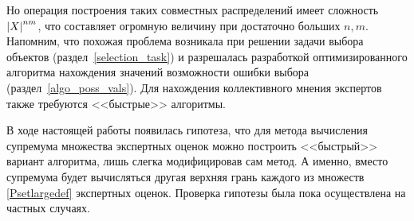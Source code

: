 Но операция построения таких совместных распределений имеет сложность $\left| X \right|^{nm}$, что составляет огромную величину при достаточно больших $n, m$. Напомним, что похожая проблема возникала при решении задачи выбора объектов (раздел~\ref{selection_task}) и разрешалась разработкой оптимизированного алгоритма нахождения значений возможности ошибки выбора (раздел~\ref{algo_poss_vals}). Для нахождения коллективного мнения экспертов также требуются <<быстрые>> алгоритмы.

В ходе настоящей работы появилась гипотеза, что для метода вычисления супремума множества экспертных оценок можно построить <<быстрый>> вариант алгоритма, лишь слегка модифицировав сам метод. А именно, вместо супремума будет вычисляться другая верхняя грань каждого из множеств \eqref{Psetlargedef} экспертных оценок. Проверка гипотезы была пока осуществлена на частных случаях. 


